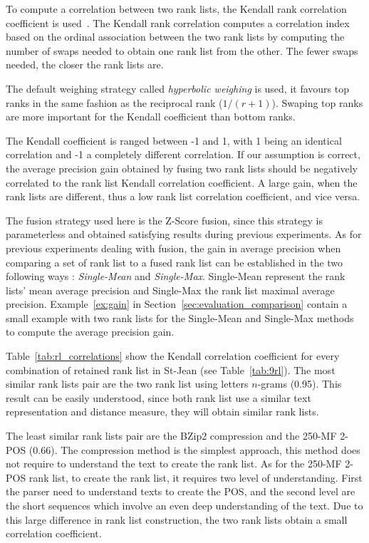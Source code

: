 To compute a correlation between two rank lists, the Kendall rank correlation coefficient is used~\cite{scipy}.
The Kendall rank correlation computes a correlation index based on the ordinal association between the two rank lists by computing the number of swaps needed to obtain one rank list from the other.
The fewer swaps needed, the closer the rank lists are.

The default weighing strategy called \textit{hyperbolic weighing} is used, it favours top ranks in the same fashion as the reciprocal rank ($1 / (r + 1)$).
Swaping top ranks are more important for the Kendall coefficient than bottom ranks.

The Kendall coefficient is ranged between -1 and 1, with 1 being an identical correlation and -1 a completely different correlation.
If our assumption is correct, the average precision gain obtained by fusing two rank lists should be negatively correlated to the rank list Kendall correlation coefficient.
A large gain, when the rank lists are different, thus a low rank list correlation coefficient, and vice versa.

The fusion strategy used here is the Z-Score fusion, since this strategy is parameterless and obtained satisfying results during previous experiments.
As for previous experiments dealing with fusion, the gain in average precision when comparing a set of rank list to a fused rank list can be established in the two following ways : \textit{Single-Mean} and \textit{Single-Max}.
Single-Mean represent the rank lists' mean average precision and Single-Max the rank list maximal average precision.
Example~\ref{ex:gain} in Section~\ref{sec:evaluation_comparison} contain a small example with two rank lists for the Single-Mean and Single-Max methods to compute the average precision gain.

Table~\ref{tab:rl_correlations} show the Kendall correlation coefficient for every combination of retained rank list in St-Jean (see Table~\ref{tab:9rl}).
The most similar rank lists pair are the two rank list using letters $n$-grams (0.95).
This result can be easily understood, since both rank list use a similar text representation and distance measure, they will obtain similar rank lists.

The least similar rank lists pair are the BZip2 compression and the 250-MF 2-POS (0.66).
The compression method is the simplest approach, this method does not require to understand the text to create the rank list.
As for the 250-MF 2-POS rank list, to create the rank list, it requires two level of understanding.
First the parser need to understand texts to create the POS, and the second level are the short sequences which involve an even deep understanding of the text.
Due to this large difference in rank list construction, the two rank lists obtain a small correlation coefficient.

